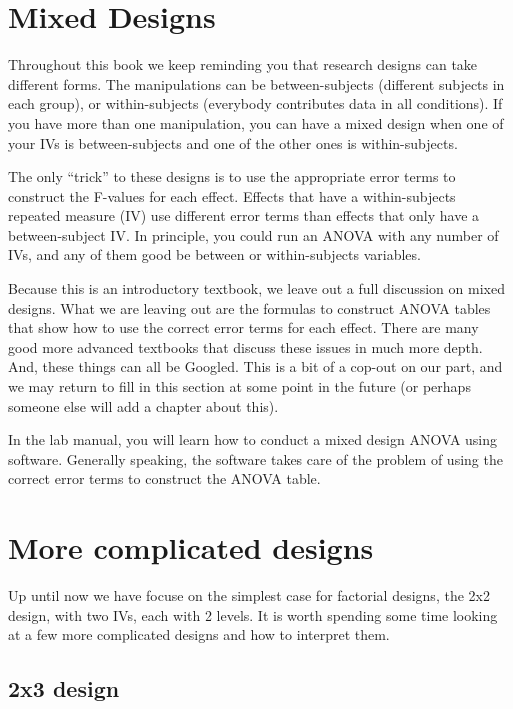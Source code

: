 \documentclass[
]{book}
\begin{document}
\hypertarget{mixed-designs}{%
\section{Mixed Designs}\label{mixed-designs}}

Throughout this book we keep reminding you that research designs can take different forms. The manipulations can be between-subjects (different subjects in each group), or within-subjects (everybody contributes data in all conditions). If you have more than one manipulation, you can have a mixed design when one of your IVs is between-subjects and one of the other ones is within-subjects.

The only ``trick'' to these designs is to use the appropriate error terms to construct the F-values for each effect. Effects that have a within-subjects repeated measure (IV) use different error terms than effects that only have a between-subject IV. In principle, you could run an ANOVA with any number of IVs, and any of them good be between or within-subjects variables.

Because this is an introductory textbook, we leave out a full discussion on mixed designs. What we are leaving out are the formulas to construct ANOVA tables that show how to use the correct error terms for each effect. There are many good more advanced textbooks that discuss these issues in much more depth. And, these things can all be Googled. This is a bit of a cop-out on our part, and we may return to fill in this section at some point in the future (or perhaps someone else will add a chapter about this).

In the lab manual, you will learn how to conduct a mixed design ANOVA using software. Generally speaking, the software takes care of the problem of using the correct error terms to construct the ANOVA table.

\hypertarget{more-complicated-designs}{%
\section{More complicated designs}\label{more-complicated-designs}}

Up until now we have focuse on the simplest case for factorial designs, the 2x2 design, with two IVs, each with 2 levels. It is worth spending some time looking at a few more complicated designs and how to interpret them.

\hypertarget{x3-design}{%
\subsection{2x3 design}\label{x3-design}}
\end{document}
